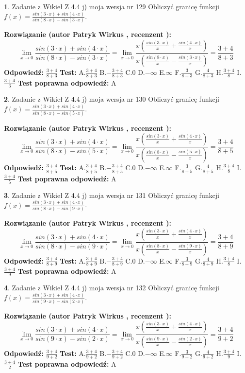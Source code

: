 \documentclass[12pt, a4paper]{article}
\theoremstyle{definition} %
\newtheorem{zad}{}
\newcommand{\zadStart}[1]{\begin{zad}#1\newline}
\newcommand{\zadStop}{\end{zad}}
\newcommand{\rozwStart}[2]{\noindent \textbf{Rozwiązanie (autor #1 , recenzent #2): }\newline}
\newcommand{\rozwStop}{\newline}
\newcommand{\odpStart}{\noindent \textbf{Odpowiedź:}\newline}
\newcommand{\odpStop}{\newline}
\newcommand{\testStart}{\noindent \textbf{Test:}\newline}
\newcommand{\testStop}{\newline}
\newcommand{\kluczStart}{\noindent \textbf{Test poprawna odpowiedź:}\newline}
\newcommand{\kluczStop}{\newline}
\begin{document}
\zadStart{Zadanie z Wikieł Z 4.4 j) moja wersja nr 129}
Obliczyć granicę funkcji $f(x)=\frac{sin(3\cdot x) +sin(4\cdot x)}{sin(8\cdot x) -sin(3\cdot x)}$.
\zadStop
\rozwStart{Patryk Wirkus}{}
$$\lim\limits_{x\to 0}\frac{sin(3\cdot x) +sin(4\cdot x)}{sin(8\cdot x) -sin(3\cdot x)}=\lim\limits_{x\to 0}\frac{x(\frac{sin(3\cdot x)}{x}+\frac{sin(4\cdot x)}{x})}{x(\frac{sin(8\cdot x)}{x}-\frac{sin(3\cdot x)}{x})}=\frac{3+4}{8+3}$$
\rozwStop
\odpStart
$\frac{3+4}{8+3}$
\odpStop
\testStart
A.$\frac{3+4}{8+3}$
B.$-\frac{3+4}{8+3}$
C.$0$
D.$-\infty$
E.$\infty$
F.$\frac{3}{8+3}$
G.$\frac{4}{8+3}$
H.$\frac{3+4}{8}$
I.$\frac{3+4}{3}$
\testStop
\kluczStart
A
\kluczStop



\zadStart{Zadanie z Wikieł Z 4.4 j) moja wersja nr 130}
Obliczyć granicę funkcji $f(x)=\frac{sin(3\cdot x) +sin(4\cdot x)}{sin(8\cdot x) -sin(5\cdot x)}$.
\zadStop
\rozwStart{Patryk Wirkus}{}
$$\lim\limits_{x\to 0}\frac{sin(3\cdot x) +sin(4\cdot x)}{sin(8\cdot x) -sin(5\cdot x)}=\lim\limits_{x\to 0}\frac{x(\frac{sin(3\cdot x)}{x}+\frac{sin(4\cdot x)}{x})}{x(\frac{sin(8\cdot x)}{x}-\frac{sin(5\cdot x)}{x})}=\frac{3+4}{8+5}$$
\rozwStop
\odpStart
$\frac{3+4}{8+5}$
\odpStop
\testStart
A.$\frac{3+4}{8+5}$
B.$-\frac{3+4}{8+5}$
C.$0$
D.$-\infty$
E.$\infty$
F.$\frac{3}{8+5}$
G.$\frac{4}{8+5}$
H.$\frac{3+4}{8}$
I.$\frac{3+4}{5}$
\testStop
\kluczStart
A
\kluczStop



\zadStart{Zadanie z Wikieł Z 4.4 j) moja wersja nr 131}
Obliczyć granicę funkcji $f(x)=\frac{sin(3\cdot x) +sin(4\cdot x)}{sin(8\cdot x) -sin(9\cdot x)}$.
\zadStop
\rozwStart{Patryk Wirkus}{}
$$\lim\limits_{x\to 0}\frac{sin(3\cdot x) +sin(4\cdot x)}{sin(8\cdot x) -sin(9\cdot x)}=\lim\limits_{x\to 0}\frac{x(\frac{sin(3\cdot x)}{x}+\frac{sin(4\cdot x)}{x})}{x(\frac{sin(8\cdot x)}{x}-\frac{sin(9\cdot x)}{x})}=\frac{3+4}{8+9}$$
\rozwStop
\odpStart
$\frac{3+4}{8+9}$
\odpStop
\testStart
A.$\frac{3+4}{8+9}$
B.$-\frac{3+4}{8+9}$
C.$0$
D.$-\infty$
E.$\infty$
F.$\frac{3}{8+9}$
G.$\frac{4}{8+9}$
H.$\frac{3+4}{8}$
I.$\frac{3+4}{9}$
\testStop
\kluczStart
A
\kluczStop



\zadStart{Zadanie z Wikieł Z 4.4 j) moja wersja nr 132}
Obliczyć granicę funkcji $f(x)=\frac{sin(3\cdot x) +sin(4\cdot x)}{sin(9\cdot x) -sin(2\cdot x)}$.
\zadStop
\rozwStart{Patryk Wirkus}{}
$$\lim\limits_{x\to 0}\frac{sin(3\cdot x) +sin(4\cdot x)}{sin(9\cdot x) -sin(2\cdot x)}=\lim\limits_{x\to 0}\frac{x(\frac{sin(3\cdot x)}{x}+\frac{sin(4\cdot x)}{x})}{x(\frac{sin(9\cdot x)}{x}-\frac{sin(2\cdot x)}{x})}=\frac{3+4}{9+2}$$
\rozwStop
\odpStart
$\frac{3+4}{9+2}$
\odpStop
\testStart
A.$\frac{3+4}{9+2}$
B.$-\frac{3+4}{9+2}$
C.$0$
D.$-\infty$
E.$\infty$
F.$\frac{3}{9+2}$
G.$\frac{4}{9+2}$
H.$\frac{3+4}{9}$
I.$\frac{3+4}{2}$
\testStop
\kluczStart
A
\kluczStop
\end{document}
